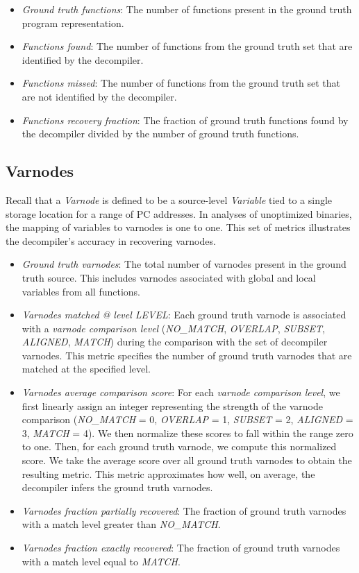 \begin{itemize}
    \item \emph{Ground truth functions}: The number of functions present in the ground truth program representation.
    \item \emph{Functions found}: The number of functions from the ground truth set that are identified by the decompiler.
    \item \emph{Functions missed}: The number of functions from the ground truth set that are not identified by the decompiler.
    \item \emph{Functions recovery fraction}: The fraction of ground truth functions found by the decompiler divided by the number of ground truth functions.
\end{itemize}

\subsection{Varnodes}

Recall that a \emph{Varnode} is defined to be a source-level \emph{Variable} tied to a single storage location for a range of PC addresses. In analyses of unoptimized binaries, the mapping of variables to varnodes is one to one. This set of metrics illustrates the decompiler's accuracy in recovering varnodes.

\begin{itemize}
    \item \emph{Ground truth varnodes}: The total number of varnodes present in the ground truth source. This includes varnodes associated with global and local variables from all functions.
    \item \emph{Varnodes matched @ level LEVEL}: Each ground truth varnode is associated with a \emph{varnode comparison level} (\emph{NO\_MATCH}, \emph{OVERLAP}, \emph{SUBSET}, \emph{ALIGNED}, \emph{MATCH}) during the comparison with the set of decompiler varnodes. This metric specifies the number of ground truth varnodes that are matched at the specified level.
    \item \emph{Varnodes average comparison score}: For each \emph{varnode comparison level}, we first linearly assign an integer representing the strength of the varnode comparison (\emph{NO\_MATCH} = 0, \emph{OVERLAP} = 1, \emph{SUBSET} = 2, \emph{ALIGNED} = 3, \emph{MATCH} = 4). We then normalize these scores to fall within the range zero to one. Then, for each ground truth varnode, we compute this normalized score. We take the average score over all ground truth varnodes to obtain the resulting metric. This metric approximates how well, on average, the decompiler infers the ground truth varnodes.
    \item \emph{Varnodes fraction partially recovered}: The fraction of ground truth varnodes with a match level greater than \emph{NO\_MATCH}.
    \item \emph{Varnodes fraction exactly recovered}: The fraction of ground truth varnodes with a match level equal to \emph{MATCH}.
\end{itemize}

